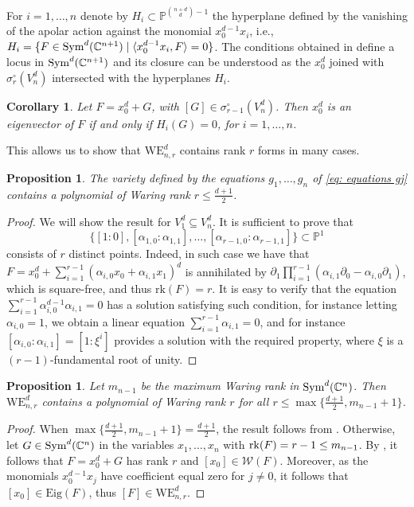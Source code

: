 \documentclass{amsart}
\numberwithin{theorem}{section}
\newtheorem{proposition}[theorem]{Proposition}
\newtheorem{corollary}[theorem]{Corollary}
\theoremstyle{definition}
\newcommand{\Eig}{\mathrm{Eig}}
\newcommand{\W}{\mathcal{W}}
\newcommand{\PP}{\mathbb{P}}
\newcommand{\CC}{\mathbb{C}}
\newcommand{\rk}{\mathop{\rm rk}\nolimits}
\newcommand{\sym}{\mathop{\rm Sym}\nolimits}
\begin{document}
For $i=1,\dots, n$ denote by $H_i\subset \PP^{\binom{n+d}{d}-1}$ the hyperplane defined by the vanishing of the apolar action against the monomial $x_0^{d-1}x_i$, i.e., $H_i = \{F\in {\rm Sym}^d(\mathbb{C}^{n+1}) \mid \langle x_0^{d-1}x_i, F \rangle = 0\}$. 
The conditions obtained in  define a locus in $\sym^d(\CC^{n+1})$ and its closure can be understood as the $x_0^d$ joined with $\sigma_r^\circ(V_n^d)$ intersected with the hyperplanes $H_i$.

\begin{corollary}\label{cor: join}
    Let $F=x_0^d+G$, with $[G]\in \sigma_{r-1}^\circ(V_n^d)$. Then $x_0^d$ is an eigenvector of $F$ if and only if $H_i (G)=0 $, for $i=1,\dots, n$.
\end{corollary} 

This allows us to show that $\mathrm{WE}_{n,r}^d$ contains rank $r$ forms in many cases.

\begin{proposition}\label{prop:rankrbinary}
    The variety defined by the equations $g_1,\dots,g_n$ of \cref{eq: equations gj} contains a polynomial of Waring rank $r\leq \frac{d+1}{2}$.
\end{proposition}
\begin{proof}
  We will show the result for $V_1^d\subseteq V_n^d$. It is sufficient to prove that $$\{[1:0],[\alpha_{1,0}:\alpha_{1,1}],\dots, [\alpha_{r-1,0}:\alpha_{r-1,1}]\}\subset\PP^1$$ consists of $r$ distinct points. Indeed, in such case we have that $F=x_0^d+\sum_{i=1}^{r-1} (\alpha_{i,0}x_0+\alpha_{i,1}x_1)^d$ is annihilated by $\partial_1\prod_{i=1}^{r-1}(\alpha_{i,1}\partial_0-\alpha_{i,0}\partial_1)$, which is square-free, and thus $\mathrm{rk}(F)=r$. It is easy to verify that the equation $\sum_{i=1}^{r-1}\alpha_{i,0}^{d-1}\alpha_{i,1}=0$ has a solution satisfying such condition, for instance letting $\alpha_{i,0}=1$, we obtain a linear equation $\sum_{i=1}^{r-1}\alpha_{i,1}=0$, and for instance $[\alpha_{i,0}:\alpha_{i,1}]=[1:\xi^i]$ provides a solution with the required property, where $\xi$ is a $(r-1)$-fundamental root of unity.
\end{proof}






\begin{proposition}\label{prop:rk in WE}
    Let $m_{n-1}$ be the maximum Waring rank in $\sym^d(\CC^n)$. Then $\mathrm{WE}_{n,r}^d$ contains a polynomial of Waring rank $r$ for all $r\leq \max\{\frac{d+1}{2}, m_{n-1}+1\}$. 
\end{proposition}
\begin{proof}
  When $\max\{\frac{d+1}{2}, m_{n-1}+1\}=\frac{d+1}{2}$, the result follows from . 
  Otherwise, let $G\in \sym^d(\CC^n)$ in the variables $x_1,\dots,x_n$ with $\rk(F)=r-1\leq m_{n-1}$. By \cite[Theorem 1.1]{CCC15}, it follows that $F=x_0^d+G$ has rank $r$ and $[x_0]\in\W(F)$. Moreover, as the monomials $x_0^{d-1}x_j$ have coefficient equal zero for $j\neq 0$, it follows that $[x_0]\in\Eig(F)$, thus $[F]\in \mathrm{WE}_{n,r}^d$.
\end{proof}
\end{document}
